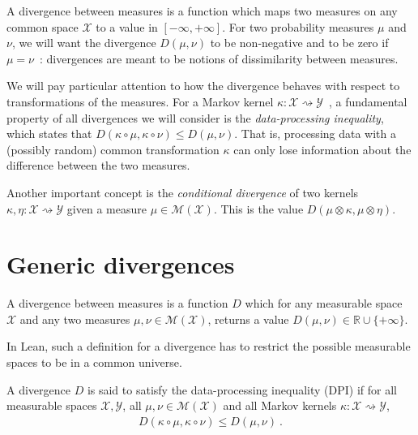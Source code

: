 A divergence between measures is a function which maps two measures on any common space $\mathcal X$ to a value in $[-\infty, +\infty]$.
For two probability measures $\mu$ and $\nu$, we will want the divergence $D(\mu, \nu)$ to be non-negative and to be zero if $\mu = \nu$~: divergences are meant to be notions of dissimilarity between measures.

We will pay particular attention to how the divergence behaves with respect to transformations of the measures.
For a Markov kernel $\kappa : \mathcal X \rightsquigarrow \mathcal Y$~, a fundamental property of all divergences we will consider is the \emph{data-processing inequality}, which states that $D(\kappa \circ \mu, \kappa \circ \nu) \le D(\mu, \nu)$.
That is, processing data with a (possibly random) common transformation $\kappa$ can only lose information about the difference between the two measures.

Another important concept is the \emph{conditional divergence} of two kernels $\kappa, \eta : \mathcal X \rightsquigarrow \mathcal Y$ given a measure $\mu \in \mathcal M(\mathcal X)$. This is the value $D(\mu \otimes \kappa, \mu \otimes \eta)$.

\section{Generic divergences}

\begin{definition}[Divergence]
  \label{def:div}
  \uses{}
  A divergence between measures is a function $D$ which for any measurable space $\mathcal X$ and any two measures $\mu, \nu \in \mathcal M(\mathcal X)$, returns a value $D(\mu, \nu) \in \mathbb{R} \cup \{+\infty\}$.
\end{definition}

In Lean, such a definition for a divergence has to restrict the possible measurable spaces to be in a common universe.

\begin{definition}
  \label{def:dpi}
  A divergence $D$ is said to satisfy the data-processing inequality (DPI) if for all measurable spaces $\mathcal X, \mathcal Y$, all $\mu, \nu \in \mathcal M(\mathcal X)$ and all Markov kernels $\kappa : \mathcal X \rightsquigarrow \mathcal Y$,
  \begin{align*}
  D(\kappa \circ \mu, \kappa \circ \nu) \le D(\mu, \nu) \: .
  \end{align*}
\end{definition}


